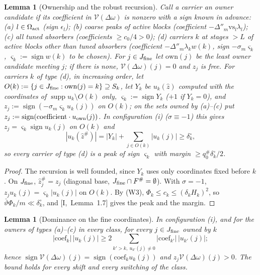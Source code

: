 \documentclass[10pt]{amsart}
\newtheorem{lemma}[theorem]{Lemma}
\theoremstyle{definition}
\theoremstyle{remark}
\newcommand{\supp}{\operatorname{supp}}
\newcommand{\sgn}{\operatorname{sign}}
\newcommand{\zh}{\hat z}
\begin{document}
\begin{lemma}[Ownership and the robust recursion]\label{lem:II-recursion}
Call a carrier an \emph{owner candidate} if its coefficient in $\mathcal V(\Delta\omega)$ is
nonzero with a sign known in advance: \textup{(a)} $l\in\Omega_{\rm act}$ \textup{(}sign
$\epsilon_l$\textup{)}; \textup{(b)} coarse peaks of active blocks \textup{(}coefficient
$-\Delta''_m\mathrm{vs}_l\lambda_l$\textup{)}; \textup{(c)} all tuned absorbers \textup{(}coefficients
$\ge c_0/4>0$\textup{)}; \textup{(d)} carriers $k$ at stages $>L$ of active blocks
other than tuned absorbers \textup{(}coefficient $-\Delta''_m\lambda_kw(k)$, sign
$-\sigma_m\varsigma_k$, $\varsigma_k:=\sgn w(k)$ to be chosen\textup{)}.  For $j\in J_{\rm fine}$
let $\mathrm{own}(j)$ be the least owner candidate meeting $j$; if there is none,
$\mathcal V(\Delta\omega)(j)=0$ and $z_j$ is free.  For carriers $k$ of type \textup{(d)},
in increasing order, let $O(k):=\{j\in J_{\rm fine}:\mathrm{own}(j)=k\}\supseteq S_k$, let
$Y_k$ be $u_k(\zh)$ computed with the coordinates of $\supp u_k\setminus O(k)$ only,
$\varsigma_k:=\sgn Y_k$ \textup{(}$+1$ if $Y_k=0$\textup{)}, and $z_j:=\sgn(-\sigma_m\varsigma_ku_k(j))$ on
$O(k)$; on the sets owned by \textup{(a)}--\textup{(c)} put $z_j:=\sgn(\text{coefficient}
\cdot u_{\rm own}(j))$.  In configuration \textup{(i)} \textup{(}$\sigma\equiv-1$\textup{)}
this gives $z_j=\varsigma_k\sgn u_k(j)$ on $O(k)$ and
\[
 |u_k(\zh^\#)|=|Y_k|+\sum_{j\in O(k)}|u_k(j)|\ge\delta^\circ_k ,
\]
so every carrier of type \textup{(d)} is a peak of sign $\varsigma_k$ with margin
$\ge q^\#_0\delta^\circ_k/2$.
\end{lemma}

\begin{proof}
The recursion is well founded, since $Y_k$ uses only coordinates fixed before
$k$.  On $J_{\rm fine}$, $\zh^\#_j=z_j$ (diagonal base, $J_{\rm fine}\cap F^\#=\emptyset$).
With $\sigma=-1$, $z_ju_k(j)=\varsigma_k|u_k(j)|$ on $O(k)$.  By (W3), $\Phi_k\le c_k\le
(\delta_kH_k)^2$, so $\bar\vartheta\Phi_k/m\ll\delta^\circ_k$, and [I,~Lemma~1.7] gives the
peak and the margin.
\end{proof}

\begin{lemma}[Dominance on the fine coordinates]\label{lem:II-domfine}
In configuration \textup{(i)}, and for the owners of types \textup{(a)}--\textup{(c)} in
every class, for every $j\in J_{\rm fine}$ owned by $k$
\[
 |\mathrm{coef}_k|\,|u_k(j)|\ge2\sum_{k'>k,\ u_{k'}(j)\ne0}|\mathrm{coef}_{k'}|\,|u_{k'}(j)| ;
\]
hence $\sgn\mathcal V(\Delta\omega)(j)=\sgn(\mathrm{coef}_ku_k(j))$ and $z_j\mathcal V(\Delta\omega)(j)>0$.  The
bound holds for every shift and every switching of the class.
\end{lemma}
\end{document}
